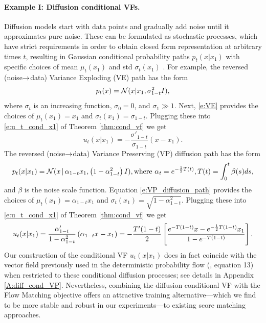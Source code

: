 \documentclass{article}
\begin{document}
\paragraph{Example I: Diffusion conditional VFs.}
Diffusion models start with data points and gradually add noise until it approximates pure noise. These can be formulated as stochastic processes, which have strict requirements in order to obtain closed form representation at arbitrary times $t$, resulting in Gaussian conditional probability paths $p_t(x\vert x_1)$ with specific choices of mean  $\mu_t(x_1)$ and std $\sigma_t(x_1)$ \citep{sohl2015deep, ho2020denoising,song2020score}. 
For example, the reversed (noise$\rightarrow$data) Variance Exploding (VE) path has the form
\begin{equation}\label{e:VE}
    p_t(x) = {\mathcal{N}}(x | x_1 , \sigma_{1-t}^2 I ),
\end{equation}
where $\sigma_t$ is an increasing function, $\sigma_0=0$, and $\sigma_1 \gg 1$.  Next, \eqref{e:VE} provides the choices of $\mu_t(x_1)= x_1$ and $\sigma_t(x_1)= \sigma_{1-t}$. Plugging these into \eqref{e:u_t_cond_x1} of Theorem \ref{thm:cond_vf} we get 
\begin{equation}\label{e:u_t_VE}
    u_t(x|x_1) = -\frac{\sigma'_{1-t}}{\sigma_{1-t}}(x-x_1).
\end{equation}
%
The reversed (noise$\rightarrow$data) Variance Preserving (VP) diffusion path has the form 
\begin{equation}\label{e:VP_diffusion_path}
    p_t(x\vert x_1) = {\mathcal{N}}(x\, \vert \, \alpha_{1-t} x_1 , \left (1-\alpha_{1-t}^2\right )I), \text{where } \alpha_t = e^{-\frac{1}{2}T(t)}, T(t)=\int_0^{t} \beta(s)ds, 
\end{equation}
and $\beta$ is the noise scale function. 
Equation \ref{e:VP_diffusion_path} provides the choices of $\mu_t(x_1)=\alpha_{1-t} x_1$ and $\sigma_t(x_1)=\sqrt{1-\alpha_{1-t}^2}$. Plugging these into \eqref{e:u_t_cond_x1} of Theorem \ref{thm:cond_vf} we get 
\begin{equation}\label{e:ut_dif_with_our_method}
    u_t(x\vert x_1) = \frac{\alpha'_{1-t}}{1-\alpha^2_{1-t}} \left (\alpha_{1-t}x-x_1\right ) = -\frac{T'(1-t)}{2}\left [
    \frac{e^{-T(1-t)}x - e^{-\frac{1}{2}T(1-t)}x_1}{1-e^{-T(1-t)}}\right ].
\end{equation}
%
Our construction of the conditional VF $u_t(x|x_1)$ does in fact coincide with the vector field previously used in the deterministic probability flow (\cite{song2020score}, equation 13) when restricted to these conditional diffusion processes; see details in Appendix \ref{A:diff_cond_VP}. 
Nevertheless, combining the diffusion conditional VF with the Flow Matching objective offers an attractive training alternative---which we find to be more stable and robust in our experiments---to existing score matching approaches. 
\end{document}
